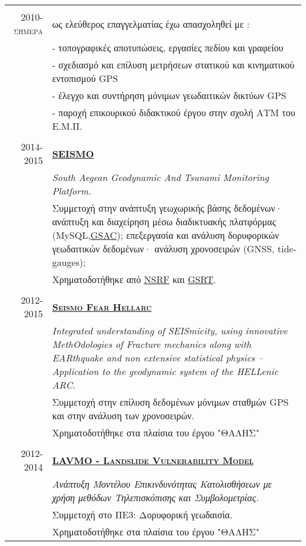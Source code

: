 \documentclass[a4paper,10pt]{article} %
\begin{document}
\begin{longtable}{r|p{13cm}}

\multicolumn{2}{c}{} \\
\textsc{2010-σήμερα} & ως ελεύθερος επαγγελματίας έχω απασχοληθεί με :\\ 
  & - τοπογραφικές αποτυπώσεις, εργασίες πεδίου και γραφείου \\
  & - σχεδιασμό και επίλυση μετρήσεων στατικού και κινηματικού εντοπισμού GPS\\
  & - έλεγχο και συντήρηση μόνιμων γεωδαιτικών δικτύων GPS\\
  & - παροχή επικουρικού διδακτικού έργου στην σχολή ΑΤΜ του Ε.Μ.Π. \\

\multicolumn{2}{c}{} \\
\textsc{2014-2015} & \textbf{\textsc{\href{http://dionysos.survey.ntua.gr/SEISMO/index.html}{SEISMO}}}\\
  & \textit{South Aegean Geodynamic And Tsunami Monitoring Platform.}\\
  & Συμμετοχή στην ανάπτυξη γεωχωρικής βάσης δεδομένων· ανάπτυξη και διαχείρηση μέσω διαδικτυακής πλατφόρμας (MySQL,\href{http://www.unavco.org/software/data-management/gsac/gsac.html}{GSAC});
    επεξεργασία και ανάλυση δορυφορικών γεωδαιτικών δεδομένων· ανάλυση χρονοσειρών (GNSS, tide-gauges); \\
  & Χρηματοδοτήθηκε από \href{http://www.espa.gr/en/Pages/Default.aspx}{NSRF} και \href{http://www.gsrt.gr/central.aspx?sId=119I428I1089I323I488743}{GSRT}.\\

\multicolumn{2}{c}{} \\
\textsc{2012-2015} & \textbf{\textsc{\href{http://excellence.minedu.gov.gr/thales/en/thalesprojects/380208}{Seismo Fear Hellarc}}}\\
  & \textit{Integrated understanding of SEISmicity, using innovative MethOdologies of Fracture mechanics along with EARthquake and non extensive statistical physics – Application to the geodynamic system of the HELLenic ARC.}\\
  & Συμμετοχή στην επίλυση δεδομένων μόνιμων σταθμών GPS και στην ανάλυση των χρονοσειρών.\\
  & Χρηματοδοτήθηκε στα πλαίσια του έργου "ΘΑΛΗΣ"\\

\multicolumn{2}{c}{} \\ 
\textsc{2012-2014} & \textbf{\textsc{\href{http://excellence.minedu.gov.gr/thales/en/thalesprojects/379347}{LAVMO - Landslide Vulnerability Model}}}\\
  & \textit{Ανάπτυξη Μοντέλου Επικινδυνότητας Κατολισθήσεων με χρήση μεθόδων Τηλεπισκόπισης και Συμβολομετρίας.}\\
  & Συμμετοχή στο ΠΕ3: Δορυφορική γεωδαισία.\\
  & Χρηματοδοτήθηκε στα πλαίσια του έργου "ΘΑΛΗΣ"\\


\end{longtable}
\end{document}
